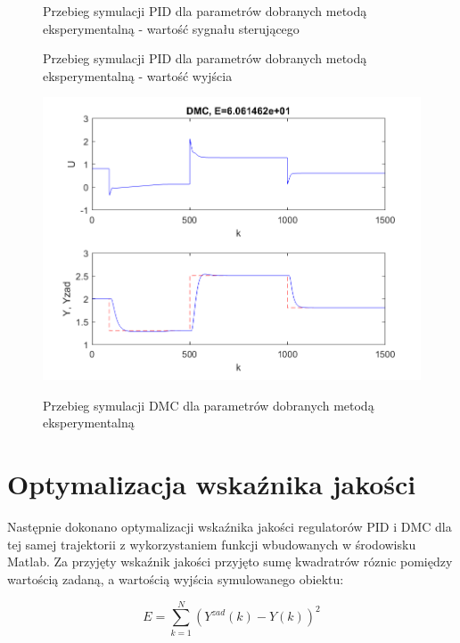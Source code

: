 \begin{figure}

\centering
\caption{Przebieg symulacji PID dla parametrów dobranych metodą eksperymentalną - wartość sygnału sterującego}

\label{pidru}
\end{figure}

\begin{figure}

\centering
\caption{Przebieg symulacji PID dla parametrów dobranych metodą eksperymentalną - wartość wyjścia}

\label{pidry}
\end{figure}

\begin{figure}

\centering
\caption{Przebieg symulacji DMC dla parametrów dobranych metodą eksperymentalną}
\includegraphics{dmc_inz.png}
\label{dmcinz}
\end{figure}



\section{Optymalizacja wskaźnika jakości}
Następnie dokonano optymalizacji wskaźnika jakości regulatorów PID i DMC dla tej samej trajektorii z wykorzystaniem funkcji wbudowanych w środowisku Matlab. Za przyjęty wskaźnik jakości przyjęto sumę kwadratrów róznic pomiędzy wartością zadaną, a wartością wyjścia symulowanego obiektu:

\begin{equation}
E = \sum_{k=1}^{N} (Y^{zad}(k)-Y(k))^2
\end{equation}

